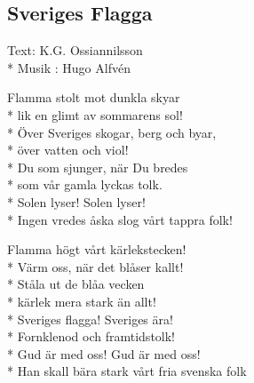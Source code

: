 \begin{SongText}
\subsection{\textbf{Sveriges Flagga}}
\begin{SongInfo}
Text: K.G. Ossiannilsson\\*%
Musik : Hugo Alfvén
\end{SongInfo}
\begin{Verse}
Flamma stolt mot dunkla skyar\\*%
lik en glimt av sommarens sol!\\*%
Över Sveriges skogar, berg och byar,\\*%
över vatten och viol!\\*%
Du som sjunger, när Du bredes\\*%
som vår gamla lyckas tolk.\\*%
Solen lyser! Solen lyser!\\*%
Ingen vredes åska slog vårt tappra folk!
\end{Verse}
\begin{Verse}
Flamma högt vårt kärlekstecken!\\*%
Värm oss, när det blåser kallt!\\*%
Ståla ut de blåa vecken\\*%
kärlek mera stark än allt!\\*%
Sveriges flagga! Sveriges ära!\\*%
Fornklenod och framtidstolk!\\*%
Gud är med oss! Gud är med oss!\\*%
Han skall bära stark vårt fria svenska folk
\end{Verse}

\end{SongText}






\newpage